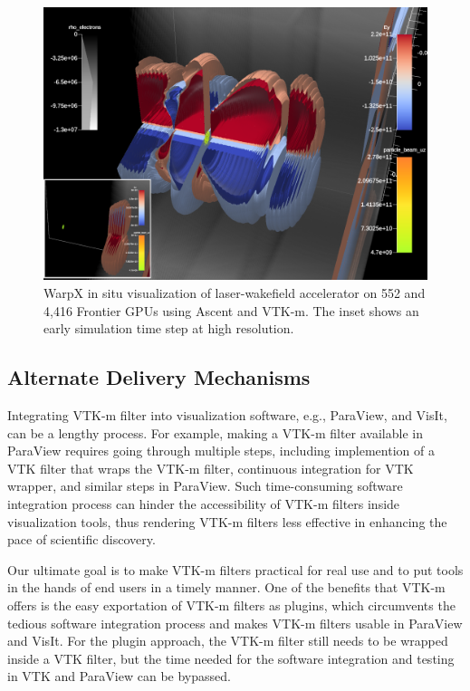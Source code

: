 \begin{figure}[htb]
  \includegraphics[width=\linewidth]{figures/warpx_stages_lwfa.png}
  \caption{WarpX in situ visualization of laser-wakefield accelerator on 552 and 4,416 Frontier GPUs using Ascent and VTK-m.
  The inset shows an early simulation time step at high resolution.}
  \label{fig:warpx_lwfa}
\end{figure}

\subsection{Alternate Delivery Mechanisms}

Integrating VTK-m filter into visualization software, e.g., ParaView, and VisIt, can be a lengthy process. For example, making a VTK-m filter available in ParaView requires going through multiple steps, including implemention of a VTK filter that wraps the VTK-m filter, continuous integration for VTK wrapper, and similar steps in ParaView. Such time-consuming software integration process can hinder the accessibility of VTK-m filters inside visualization tools, thus rendering VTK-m filters less effective in enhancing the pace of scientific discovery. 

Our ultimate goal is to make VTK-m filters practical for real use and to put tools in the hands of end users in a timely manner. One of the benefits that VTK-m offers is the easy exportation of VTK-m filters as plugins, which circumvents the tedious software integration process and makes VTK-m filters usable in ParaView and VisIt. For the plugin approach, the VTK-m filter still needs to be wrapped inside a VTK filter, but the time needed for the software integration and testing in VTK and ParaView can be bypassed.       

